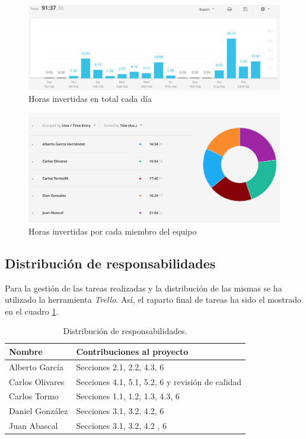 \begin{figure}[H]
\begin{center}
\includegraphics[width=1\textwidth]{./img/horasTotales.png}
\end{center}
\caption{Horas invertidas en total cada día}
\label{tab:horasTotales}
\end{figure}

\begin{figure}[H]
\begin{center}
\includegraphics[width=1\textwidth]{./img/horasMiembro.png}
\end{center}
\caption{Horas invertidas por cada miembro del equipo}
\label{tab:horasMiembro}
\end{figure}

\subsection*{Distribución de responsabilidades}
\par Para la gestión de las tareas realizadas y la distribución de las mismas se ha utilizado la herramienta \textit{Trello}. Así, el raparto final de tareas ha sido el mostrado en el cuadro \ref{tabla:respDist}.

\begin{table}[H]
\begin{center}
\begin{tabular}{ l p{9cm} }
\textbf{Nombre}&\textbf{Contribuciones al proyecto}\\
\hline \hline
Alberto García & Secciones 2.1, 2.2, 4.3, 6 \\
\hline
Carlos Olivares & Secciones 4.1, 5.1, 5.2, 6 y revisión de calidad\\
\hline
Carlos Tormo & Secciones 1.1, 1.2, 1.3, 4.3, 6\\
\hline
Daniel González & Secciones 3.1, 3.2, 4.2, 6 \\
\hline
Juan Abascal & Secciones 3.1, 3.2, 4.2 , 6\\
\hline
\end{tabular}
\caption{Distribución de responsabilidades.}
\label{tabla:respDist}
\end{center}
\end{table}
